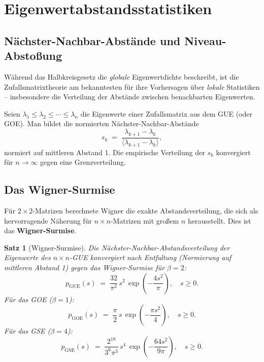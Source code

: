 \documentclass[12pt,a4paper]{amsart}
\newtheorem{theorem}{Satz}[section]
\theoremstyle{definition}
\theoremstyle{remark}
\begin{document}
\section{Eigenwertabstandsstatistiken}
\label{sec:abstaende}

\subsection{Nächster-Nachbar-Abstände und Niveau-Abstoßung}

Während das Halbkreisgesetz die \emph{globale} Eigenwertdichte beschreibt,
ist die Zufallsmatrixtheorie am bekanntesten für ihre Vorhersagen über
\emph{lokale} Statistiken -- insbesondere die Verteilung der Abstände
zwischen benachbarten Eigenwerten.

Seien $\lambda_1 \leq \lambda_2 \leq \cdots \leq \lambda_n$ die Eigenwerte
einer Zufallsmatrix aus dem GUE (oder GOE). Man bildet die normierten
Nächster-Nachbar-Abstände
\[
  s_k \;=\; \frac{\lambda_{k+1} - \lambda_k}{\langle \lambda_{k+1} - \lambda_k \rangle},
\]
normiert auf mittleren Abstand 1. Die empirische Verteilung der $s_k$
konvergiert für $n \to \infty$ gegen eine Grenzverteilung.

\subsection{Das Wigner-Surmise}

Für $2 \times 2$-Matrizen berechnete Wigner \cite{Wigner1957} die exakte
Abstandsverteilung, die sich als hervorragende Näherung für $n \times n$-Matrizen
mit großem $n$ herausstellt. Dies ist das \textbf{Wigner-Surmise}.

\begin{theorem}[Wigner-Surmise]
\label{thm:surmise}
Die Nächster-Nachbar-Abstandsverteilung der Eigenwerte des $n \times n$-GUE
konvergiert nach Entfaltung (Normierung auf mittleren Abstand 1) gegen das
Wigner-Surmise für $\beta = 2$:
\[
  p_{\mathrm{GUE}}(s) \;=\; \frac{32}{\pi^2}\,s^2\,\exp\!\left(-\frac{4s^2}{\pi}\right),
  \quad s \geq 0.
\]
Für das GOE ($\beta = 1$):
\[
  p_{\mathrm{GOE}}(s) \;=\; \frac{\pi}{2}\,s\,\exp\!\left(-\frac{\pi s^2}{4}\right),
  \quad s \geq 0.
\]
Für das GSE ($\beta = 4$):
\[
  p_{\mathrm{GSE}}(s) \;=\; \frac{2^{18}}{3^6\pi^3}\,s^4\,\exp\!\left(-\frac{64 s^2}{9\pi}\right),
  \quad s \geq 0.
\]
\end{theorem}
\end{document}
